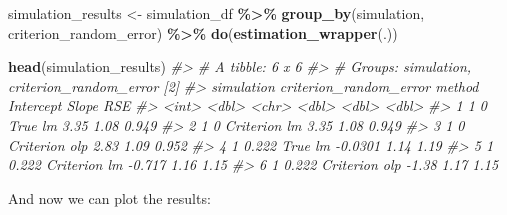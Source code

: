 \documentclass[
]{book}
\newenvironment{Shaded}{\begin{snugshade}}{\end{snugshade}}
\newcommand{\CommentTok}[1]{\textcolor[rgb]{0.56,0.35,0.01}{\textit{#1}}}
\newcommand{\KeywordTok}[1]{\textcolor[rgb]{0.13,0.29,0.53}{\textbf{#1}}}
\newcommand{\NormalTok}[1]{#1}
\newcommand{\OperatorTok}[1]{\textcolor[rgb]{0.81,0.36,0.00}{\textbf{#1}}}
\newcommand{\StringTok}[1]{\textcolor[rgb]{0.31,0.60,0.02}{#1}}
\begin{document}
\begin{Shaded}
\begin{Highlighting}[]
\NormalTok{simulation\_results <{-}}\StringTok{ }\NormalTok{simulation\_df }\OperatorTok{\%>\%}
\StringTok{  }\KeywordTok{group\_by}\NormalTok{(simulation, criterion\_random\_error) }\OperatorTok{\%>\%}
\StringTok{  }\KeywordTok{do}\NormalTok{(}\KeywordTok{estimation\_wrapper}\NormalTok{(.))}


\KeywordTok{head}\NormalTok{(simulation\_results)}
\CommentTok{\#> \# A tibble: 6 x 6}
\CommentTok{\#> \# Groups:   simulation, criterion\_random\_error [2]}
\CommentTok{\#>   simulation criterion\_random\_error method        Intercept Slope   RSE}
\CommentTok{\#>        <int>                  <dbl> <chr>             <dbl> <dbl> <dbl>}
\CommentTok{\#> 1          1                  0     True lm          3.35    1.08 0.949}
\CommentTok{\#> 2          1                  0     Criterion lm     3.35    1.08 0.949}
\CommentTok{\#> 3          1                  0     Criterion olp    2.83    1.09 0.952}
\CommentTok{\#> 4          1                  0.222 True lm         {-}0.0301  1.14 1.19 }
\CommentTok{\#> 5          1                  0.222 Criterion lm    {-}0.717   1.16 1.15 }
\CommentTok{\#> 6          1                  0.222 Criterion olp   {-}1.38    1.17 1.15}
\end{Highlighting}
\end{Shaded}

And now we can plot the results:
\end{document}
